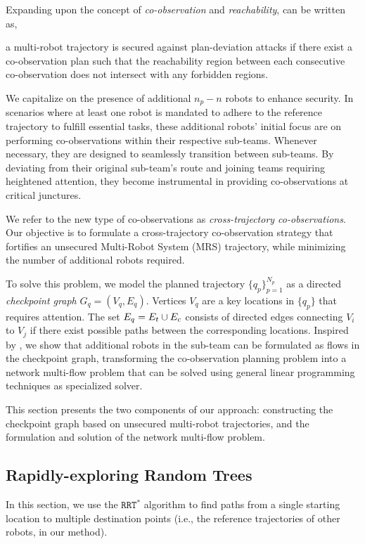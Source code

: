 \documentclass[journal]{IEEEtran}  %
\newcommand{\rrtstar}{$\texttt{RRT}^\texttt{*}$}
\begin{document}
Expanding upon the concept of \emph{co-observation} and \emph{reachability},  can be written as,
\begin{remark}\label{rmk:revised-security}
  a multi-robot trajectory is secured against plan-deviation attacks if there exist a co-observation plan such that the reachability region between each consecutive co-observation does not intersect with any forbidden regions.
\end{remark}

We capitalize on the presence of additional $n_p-n$ robots to enhance security.
In scenarios where at least one robot is mandated to adhere to the reference trajectory to fulfill essential tasks, these additional robots' initial focus are on performing co-observations within their respective sub-teams. Whenever necessary, they are designed to seamlessly transition between sub-teams. By deviating from their original sub-team's route and joining teams requiring heightened attention, they become instrumental in providing co-observations at critical junctures. 

We refer to the new type of co-observations as \emph{cross-trajectory co-observations}. Our objective is to formulate a cross-trajectory co-observation strategy that fortifies an unsecured Multi-Robot System (MRS) trajectory, while minimizing the number of additional robots required.

To solve this problem, we model the planned trajectory $\{q_p\}_{p=1}^{N_p}$ as a directed \emph{checkpoint graph} $G_{q}=(V_{q}, E_{q})$. 
Vertices $V_{q}$ are a key locations in $\{q_p\}$ that requires attention.
The set $E_{q} = E_{t} \cup E_{c}$ consists of directed edges connecting $V_i$ to $V_j$ if there exist possible paths between the corresponding locations.  Inspired by \cite{yu2013multi}, we show that additional robots in the sub-team can be formulated as flows in the checkpoint graph, transforming the co-observation planning problem into a network multi-flow problem that can be solved using general linear programming techniques as specialized solver. 

This section presents the two components of our approach: constructing the checkpoint graph based on unsecured multi-robot trajectories, and the formulation and solution of the network multi-flow problem.

\subsection{Rapidly-exploring Random Trees}
In this section, we use the \rrtstar{} \cite{karaman2010incremental} algorithm to find paths from a single starting location to multiple destination points (i.e., the reference trajectories of other robots, in our method). 
\end{document}
